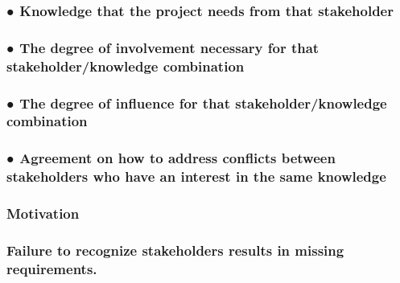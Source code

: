 \documentclass[
]{article}
\begin{document}
\hypertarget{knowledge-that-the-project-needs-from-that-stakeholder}{%
\subsubsection{● Knowledge that the project needs from that
stakeholder}\label{knowledge-that-the-project-needs-from-that-stakeholder}}

\hypertarget{the-degree-of-involvement-necessary-for-that-stakeholderknowledge-combination}{%
\subsubsection{● The degree of involvement necessary for that
stakeholder/knowledge
combination}\label{the-degree-of-involvement-necessary-for-that-stakeholderknowledge-combination}}

\hypertarget{the-degree-of-influence-for-that-stakeholderknowledge-combination}{%
\subsubsection{● The degree of influence for that stakeholder/knowledge
combination}\label{the-degree-of-influence-for-that-stakeholderknowledge-combination}}

\hypertarget{agreement-on-how-to-address-conflicts-between-stakeholders-who-have-an-interest-in-the-same-knowledge}{%
\subsubsection{● Agreement on how to address conflicts between
stakeholders who have an interest in the same
knowledge}\label{agreement-on-how-to-address-conflicts-between-stakeholders-who-have-an-interest-in-the-same-knowledge}}

\hypertarget{motivation-4}{%
\subsubsection{Motivation}\label{motivation-4}}

\hypertarget{failure-to-recognize-stakeholders-results-in-missing-requirements.}{%
\subsubsection{\texorpdfstring{Failure to recognize stakeholders results
in missing requirements.
}{Failure to recognize stakeholders results in missing requirements. }}\label{failure-to-recognize-stakeholders-results-in-missing-requirements.}}
\end{document}
